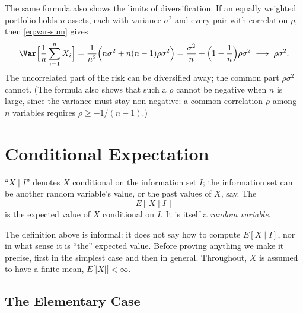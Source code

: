 The same formula also shows the limits of diversification.
If an equally weighted portfolio holds $n$ assets, each with variance $\sigma^{2}$ and every pair with correlation $\rho$, then \eqref{eq:var-sum} gives
\[
	\Var\Bigl[\frac1n\sum_{i=1}^{n}X_{i}\Bigr]
	= \frac{1}{n^{2}}\Bigl(n\sigma^{2}+n(n-1)\rho\sigma^{2}\Bigr)
	= \frac{\sigma^{2}}{n}+\Bigl(1-\frac1n\Bigr)\rho\sigma^{2}
	\;\longrightarrow\; \rho\sigma^{2} .
\]
The uncorrelated part of the risk can be diversified away; the common part $\rho\sigma^{2}$ cannot.
(The formula also shows that such a $\rho$ cannot be negative when $n$ is large, since the variance must stay non-negative: a common correlation $\rho$ among $n$ variables requires $\rho\ge-1/(n-1)$.)
\suppend

\section{Conditional Expectation}
\label{sec:conditional-expectation}


\begin{definition}
	``$X\mid I$'' denotes $X$ conditional on the information set $I$; the information set can be another random variable's value, or the past values of $X$, say.
	The 
	\[
		E[\,X\mid I\,]
	\]
	is the expected value of $X$ conditional on $I$.
	It is itself a \emph{random variable}.
\end{definition}

\suppstart
The definition above is informal: it does not say how to compute $E[X\mid I]$, nor in what sense it is ``the'' expected value.
Before proving anything we make it precise, first in the simplest case and then in general.
Throughout, $X$ is assumed to have a finite mean, $E\bigl[|X|\bigr]<\infty$.

\subsection{The Elementary Case}

